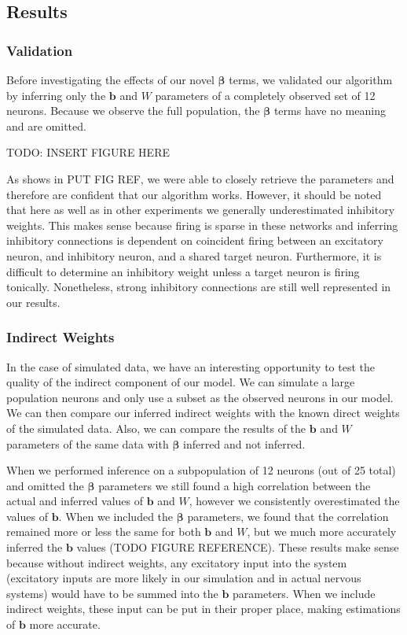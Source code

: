 \documentclass{article}
\begin{document}
\subsection{Results}

\subsubsection{Validation}

Before investigating the effects of our novel $\bm{\beta}$ terms, we validated our algorithm by inferring only the $\mathbf{b}$ and $W$ parameters of a completely observed set of 12 neurons. Because we observe the full population, the $\bm{\beta}$ terms have no meaning and are omitted.

TODO: INSERT FIGURE HERE

As shows in PUT FIG REF, we were able to closely retrieve the parameters and therefore are confident that our algorithm works. However, it should be noted that here as well as in other experiments we generally underestimated inhibitory weights. This makes sense because firing is sparse in these networks and inferring inhibitory connections is dependent on coincident firing between an excitatory neuron, and inhibitory neuron, and a shared target neuron. Furthermore, it is difficult to determine an inhibitory weight unless a target neuron is firing tonically. Nonetheless, strong inhibitory connections are still well represented in our results.

\subsubsection{Indirect Weights}

In the case of simulated data, we have an interesting opportunity to test the quality of the indirect component of our model. We can simulate a large population neurons and only use a subset as the observed neurons in our model. We can then compare our inferred indirect weights with the known direct weights of the simulated data. Also, we can compare the results of the $\mathbf{b}$ and $W$ parameters of the same data with $\bm{\beta}$ inferred and not inferred.

When we performed inference on a subpopulation of 12 neurons (out of 25 total) and omitted the $\bm{\beta}$ parameters we still found a high correlation between the actual and inferred values of $\mathbf{b}$ and $W$, however we consistently overestimated the values of $\mathbf{b}$. When we included the $\bm{\beta}$ parameters, we found that the correlation remained more or less the same for both $\mathbf{b}$ and $W$, but we much more accurately inferred the $\mathbf{b}$ values (TODO FIGURE REFERENCE). These results make sense because without indirect weights, any excitatory input into the system (excitatory inputs are more likely in our simulation and in actual nervous systems) would have to be summed into the $\mathbf{b}$ parameters. When we include indirect weights, these input can be put in their proper place, making estimations of $\mathbf{b}$ more accurate. 
\end{document}
